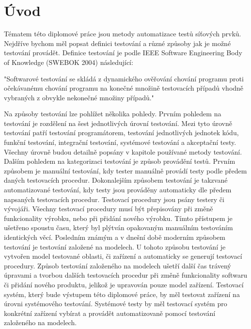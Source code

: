 \chapter{Úvod}
Tématem této diplomové práce jsou metody automatizace testů síťových prvků. Nejdříve bychom měl popsat definici testování a různé způsoby jak je možné testování provádět. Definice testování je podle IEEE Software Engineering Body of Knowledge (SWEBOK 2004) následující:

"Softwarové testování se skládá z dynamického ověřování chování programu proti očekávanému chování programu na konečné množině testovacích případů vhodně vybraných z obvykle nekonečné množiny případů." \cite{bibtex}

Na způsoby testování lze pohlížet několika pohledy. Prvním pohledem na testování je rozdělení na šest jednotlivých úrovní testování. Mezi tyto úrovně testování patří testování programátorem, testování jednotlivých jednotek kódu, funkční testování, integrační testování, systémové testování a akceptační testy. Všechny úrovně budou detailně popsány v kapitole používané metody testování. Dalším pohledem na kategorizaci testování je způsob provádění testů. Prvním způsobem je manuální testování, kdy tester manuálně provádí testy podle předem daných testovacích procedur. Dokonalejším způsobem testování je takzvané automatizované testování, kdy testy jsou prováděny automaticky dle předem napsaných testovacích procedur. Testovací procedury jsou psány testery či vývojáři. Všechny testovací procedury musí být přepisovány při změně funkcionality výrobku, nebo při přidání nového výrobku. Tímto přístupem je ušetřeno spoustu času, který byl plýtván opakovaným manuálním testováním identických věcí. Posledním známým a v dnešní době moderním způsobem testování je testování založené na modelech. U tohoto způsobu testování je vytvořen model testované oblasti, či zařízení a automaticky se generují testovací procedury. Způsob testování založeného na modelech ušetří další čas trávený úpravami a tvorbou dalších testovacích procedur při změně funkcionality softwaru či přidání nového produktu, jelikož je upravován pouze model zařízení. Testovací systém, který bude výstupem této diplomové práce, by měl testovat zařízení na úrovni systémového testování. Systémové testy by měl testovací systém pro konkrétní zařízení vybírat a  provádět automatizovaně pomocí testování založeného na modelech.

